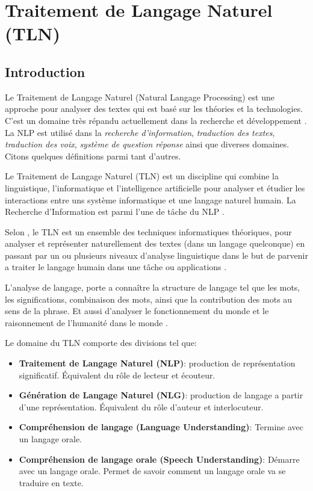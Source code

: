 \chapter{Traitement de Langage Naturel (TLN)}
\section{Introduction}
Le Traitement de Langage Naturel (Natural Langage Processing) est une approche pour analyser des textes qui est basé sur les théories et la technologies. C'est un domaine très répandu actuellement dans la recherche et développement \citep{natural-language-processing}. La NLP est utilisé dans la \emph{recherche d'information}, \emph{traduction des textes}, \emph{traduction des voix}, \emph{système de question réponse} ainsi que diverses domaines. Citons quelques définitions parmi tant d'autres.

\begin{definition}
    Le Traitement de Langage Naturel (TLN) est un discipline qui combine la linguistique, l'informatique et l'intelligence artificielle pour analyser et étudier les interactions entre uns système informatique et une langage naturel humain. La Recherche d'Information est parmi l'une de tâche du NLP \citep{art-nlp}.
\end{definition}

\begin{definition}
    Selon \citeauthor{natural-language-processing}, le TLN est un ensemble des techniques informatiques théoriques, pour analyser et représenter naturellement des textes (dans un langage quelconque) en passant par un ou plusieurs niveaux d'analyse linguistique dans le but de parvenir a traiter le langage humain dans une tâche ou applications \citep{natural-language-processing}.
\end{definition}

L'analyse de langage, porte a connaître la structure de langage tel que les mots, les significations, combinaison des mots, ainsi que la contribution des mots au sens de la phrase. Et aussi d'analyser le fonctionnement du monde et le raisonnement de l'humanité dans le monde \citep{automatic-nlp}.

Le domaine du TLN comporte des divisions tel que:
\begin{itemize}
    \item \textbf{Traitement de Langage Naturel (NLP)}: production de représentation significatif. Équivalent du rôle de lecteur et écouteur.
    \item \textbf{Génération de Langage Naturel (NLG)}: production de langage a partir d'une représentation. Équivalent du rôle d'auteur et interlocuteur.
    \item \textbf{Compréhension de langage (Language Understanding)}: Termine avec un langage orale.
    \item \textbf{Compréhension de langage orale (Speech Understanding)}: Démarre avec un langage orale. Permet de savoir comment un langage orale va se traduire en texte.
\end{itemize}

